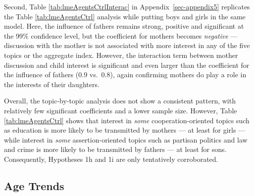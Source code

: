 \documentclass[
  letterpaper,
  DIV=11,
  numbers=noendperiod]{scrreprt}
\begin{document}
Second, Table \ref{tab:lmeAgentsCtrlInterac} in
Appendix~\ref{sec-appendix5} replicates the Table
\ref{tab:lmeAgentsCtrl} analysis while putting boys and girls in the
same model. Here, the influence of fathers remains strong, positive and
significant at the 99\% confidence level, but the coefficient for
mothers becomes \emph{negative} --- discussion with the mother is not
associated with more interest in any of the five topics or the aggregate
index. However, the interaction term between mother discussion and child
interest is significant and even larger than the coefficient for the
influence of fathers (0.9 vs.~0.8), again confirming mothers do play a
role in the interests of their daughters.

Overall, the topic-by-topic analysis does not show a consistent pattern,
with relatively few significant coefficients and a lower sample size.
However, Table \ref{tab:lmeAgentsCtrl} shows that interest in
\emph{some} cooperation-oriented topics such as education is more likely
to be transmitted by mothers --- at least for girls --- while interest
in \emph{some} assertion-oriented topics such as partisan politics and
law and crime is more likely to be transmitted by fathers --- at least
for sons. Consequently, Hypotheses 1h and 1i are only tentatively
corroborated.

\subsection{Age Trends}\label{age-trends}
\end{document}
